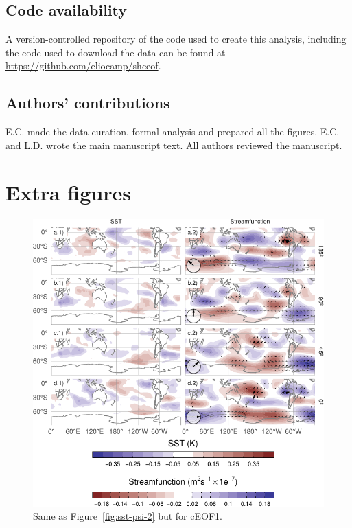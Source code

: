 \documentclass[pdflatex,lineno,sn-basic]{sn-jnl}
\theoremstyle{thmstyleone}%
\theoremstyle{thmstyletwo}%
\theoremstyle{thmstylethree}%
\begin{document}
\hypertarget{code-availability}{%
\subsection*{Code availability}\label{code-availability}}

A version-controlled repository of the code used to create this analysis, including the code used to download the data can be found at \url{https://github.com/eliocamp/shceof}.

\hypertarget{authors-contributions}{%
\subsection*{Authors' contributions}\label{authors-contributions}}

E.C. made the data curation, formal analysis and prepared all the figures. E.C. and L.D. wrote the main manuscript text.
All authors reviewed the manuscript.

\appendix


\hypertarget{extra-figures}{%
\section{Extra figures}\label{extra-figures}}

\newpage



\begin{figure}
\includegraphics{shceof_files/figure-latex/sst-psi-1-1} \caption{Same as Figure~\ref{fig:sst-psi-2} but for cEOF1.}\label{fig:sst-psi-1}
\end{figure}
\end{document}
